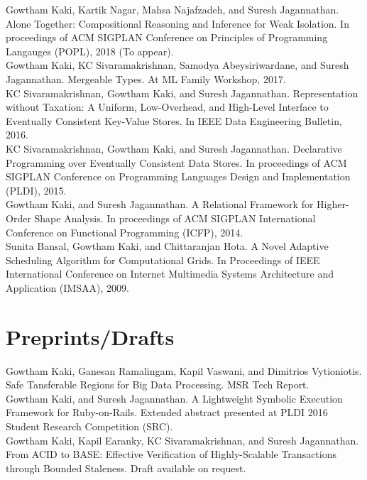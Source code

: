 \documentclass[margin,line]{res}
\begin{document}
\begin{resume}
Gowtham Kaki, Kartik Nagar, Mahsa Najafzadeh, and Suresh Jagannathan.
Alone Together: Compositional Reasoning and Inference for Weak
Isolation. In proceedings of ACM SIGPLAN Conference on Principles of
Programming Langauges (POPL), 2018 (To appear).
\vspace*{0.1in}\\
Gowtham Kaki, KC Sivaramakrishnan, Samodya Abeysiriwardane,
and Suresh Jagannathan. Mergeable Types. At ML Family Workshop,
2017.
\vspace*{0.1in}\\
KC Sivaramakrishnan, Gowtham Kaki, and Suresh Jagannathan.
Representation without Taxation: A Uniform, Low-Overhead, and
High-Level Interface to Eventually Consistent Key-Value Stores. In
IEEE Data Engineering Bulletin, 2016.
\vspace*{0.1in}\\
KC Sivaramakrishnan, Gowtham Kaki, and Suresh Jagannathan.
Declarative Programming over Eventually Consistent Data Stores. In
proceedings of ACM SIGPLAN Conference on Programming Languages Design and
Implementation (PLDI), 2015.
\vspace*{0.1in}\\
Gowtham Kaki, and Suresh Jagannathan. A Relational Framework
for Higher-Order Shape Analysis. In proceedings of
ACM SIGPLAN International Conference on Functional Programming
(ICFP), 2014.
\vspace*{0.1in}\\
Sunita Bansal, Gowtham Kaki, and Chittaranjan Hota. A Novel
Adaptive Scheduling Algorithm for Computational Grids. In
Proceedings of IEEE International Conference on Internet
Multimedia Systems Architecture and Application (IMSAA), 2009.

\section{Preprints/Drafts}
Gowtham Kaki, Ganesan Ramalingam, Kapil Vaswani, and Dimitrios
Vytioniotis. Safe Tansferable Regions for Big Data Processing.
MSR Tech Report.
\vspace*{0.1in}\\
Gowtham Kaki, and Suresh Jagannathan. A Lightweight Symbolic Execution
Framework for Ruby-on-Rails. Extended abstract presented at PLDI 2016
Student Research Competition (SRC).
\vspace*{0.1in}\\
Gowtham Kaki, Kapil Earanky, KC Sivaramakrishnan, and Suresh
Jagannathan. From {\sf ACID} to {\sf BASE}: Effective Verification of
Highly-Scalable Transactions through Bounded Staleness. Draft
available on request.
\vspace*{0.1in}\\
 

\end{resume}
\end{document}
